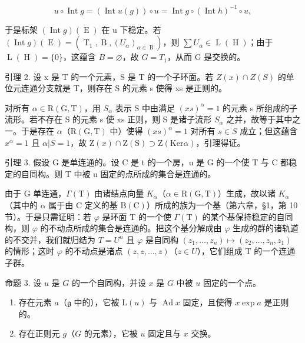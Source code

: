 \[
u \circ \operatorname{Int} g = (\operatorname{Int} u (g)) \circ u = \operatorname{Int} g \circ (\operatorname{Int} h) ^ {- 1} \circ u,
\]

于是标架 \((\operatorname{Int} g)(\operatorname{E})\) 在 u 下稳定。若 \((\operatorname{Int} g)(\operatorname{E}) = (\operatorname{T}_{1}, \operatorname{B}, (U_{\alpha})_{\alpha \in \operatorname{B}})\)，则 \(\sum U_{\alpha} \in \operatorname{L}(\operatorname{H})\)；由于 \(\operatorname{L}(\operatorname{H}) = \{0\}\)，这蕴含 \(B = \varnothing\)，故 \(G = T_{1}\)，从而 G 是交换的。

引理 2. 设 x 是 T 的一个元素，S 是 T 的一个子环面。若 \(Z(x) \cap Z(S)\) 的单位元连通分支就是 T，则存在 S 的元素 s 使得 xs 是正则的。

对所有 \(\alpha\in\mathrm{R}(\mathrm{G},\mathrm{T})\)，用 \(S_{\alpha}\) 表示 S 中由满足 \((xs)^{\alpha}=1\) 的元素 s 所组成的子流形。若不存在 S 的元素 s 使 xs 正则，则 S 是诸子流形 \(S_{\alpha}\) 之并，故等于其中之一。于是存在 \(\alpha\)（\(\mathrm{R}(\mathrm{G},\mathrm{T})\) 中）使得 \((xs)^{\alpha}=1\) 对所有 \(s\in S\) 成立；但这蕴含 \(x^{\alpha}=1\) 且 \(\alpha|S=1\)，故 \(\mathrm{Z}(x)\cap\mathrm{Z}(\mathrm{S})\supset\mathrm{Z}(\mathrm{Ker}\alpha)\)，引理得证。

引理 3. 假设 G 是单连通的。设 C 是 t 的一个房，u 是 G 的一个使 T 与 C 都稳定的自同构。则 T 中被 u 固定的点所成的集合是连通的。

由于 G 单连通，\(\varGamma(\mathrm{T})\) 由诸结点向量 \(K_{\alpha}\)（\(\alpha \in \mathrm{R}(\mathrm{G}, \mathrm{T})\)）生成，故以诸 \(K_{\alpha}\)（其中的 \(\alpha\) 属于由 C 定义的基 \(\mathrm{B}(\mathrm{C})\)）所成的族为一个基（第六章，§1，第 10 节）。于是只需证明：若 \(\varphi\) 是环面 T 的一个使 \(\varGamma(\mathrm{T})\) 的某个基保持稳定的自同构，则 \(\varphi\) 的不动点所成的集合是连通的。把这个基分解成由 \(\varphi\) 生成的群的诸轨道的不交并，我们就归结为 \(T = U^{n}\) 且 \(\varphi\) 是自同构 \((z_{1}, \ldots, z_{n}) \mapsto (z_{2}, \ldots, z_{n}, z_{1})\) 的情形；这时 \(\varphi\) 的不动点是诸点 \((z, z, \ldots, z)\)（\(z \in U\)），它们组成 T 的一个连通子群。

命题 3. 设 \(u\) 是 \(G\) 的一个自同构，并设 \(x\) 是 \(G\) 中被 \(u\) 固定的一个点。

\begin{enumerate}
\def\labelenumi{\alph{enumi})}
\item
  存在元素 \(a\)（\(\mathfrak{g}\) 中的），它被 \(\mathrm{L}(u)\) 与 \(\operatorname{Ad} x\) 固定，且使得 \(x \exp a\) 是正则的。
\item
  存在正则元 \(g\)（\(G\) 的元素），它被 \(u\) 固定且与 \(x\) 交换。
\end{enumerate}

